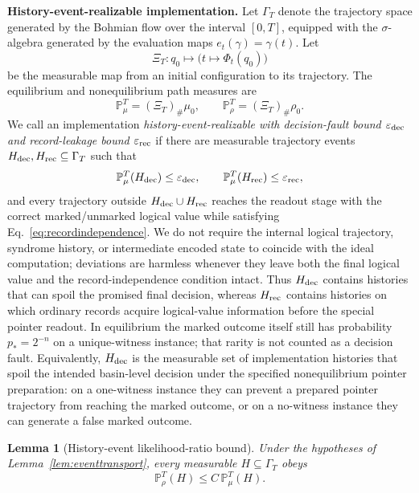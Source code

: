 \documentclass[pdflatex,sn-mathphys-num]{sn-jnl}
\theoremstyle{thmstyleone}
\newtheorem{lemma}{Lemma}
\begin{document}
\medskip
\noindent\textbf{History-event-realizable implementation.}
Let $\Gamma_T$ denote the trajectory space generated by the Bohmian flow over the interval $[0,T]$, equipped with the $\sigma$-algebra generated by the evaluation maps $e_t(\gamma)=\gamma(t)$. Let
\begin{equation}
\Xi_T:q_0\longmapsto \bigl(t\mapsto\Phi_t(q_0)\bigr)
\end{equation}
be the measurable map from an initial configuration to its trajectory. The equilibrium and nonequilibrium path measures are
\begin{equation}
\mathbb P_\mu^T=(\Xi_T)_\#\mu_0,
\qquad
\mathbb P_\rho^T=(\Xi_T)_\#\rho_0.
\label{eq:pathmeasures}
\end{equation}
We call an implementation \emph{history-event-realizable with decision-fault bound $\varepsilon_{\rm dec}$ and record-leakage bound $\varepsilon_{\rm rec}$} if there are measurable trajectory events $H_{\rm dec},H_{\rm rec}\subseteq\Gamma_T$ such that
\begin{equation}
\mathbb P_\mu^T(H_{\rm dec})\le\varepsilon_{\rm dec},
\qquad
\mathbb P_\mu^T(H_{\rm rec})\le\varepsilon_{\rm rec},
\label{eq:historyrealizable}
\end{equation}
and every trajectory outside $H_{\rm dec}\cup H_{\rm rec}$ reaches the readout stage with the correct marked/unmarked logical value while satisfying Eq.~\eqref{eq:recordindependence}. We do not require the internal logical trajectory, syndrome history, or intermediate encoded state to coincide with the ideal computation; deviations are harmless whenever they leave both the final logical value and the record-independence condition intact. Thus $H_{\rm dec}$ contains histories that can spoil the promised final decision, whereas $H_{\rm rec}$ contains histories on which ordinary records acquire logical-value information before the special pointer readout. In equilibrium the marked outcome itself still has probability $p_*=2^{-n}$ on a unique-witness instance; that rarity is not counted as a decision fault. Equivalently, $H_{\rm dec}$ is the measurable set of implementation histories that spoil the intended basin-level decision under the specified nonequilibrium pointer preparation: on a one-witness instance they can prevent a prepared pointer trajectory from reaching the marked outcome, or on a no-witness instance they can generate a false marked outcome.

\begin{lemma}[History-event likelihood-ratio bound]
\label{lem:historyevent}
Under the hypotheses of Lemma~\ref{lem:eventtransport}, every measurable $H\subseteq\Gamma_T$ obeys
\begin{equation}
\mathbb P_\rho^T(H)\le C\,\mathbb P_\mu^T(H).
\label{eq:historybound}
\end{equation}
\end{lemma}
\end{document}
